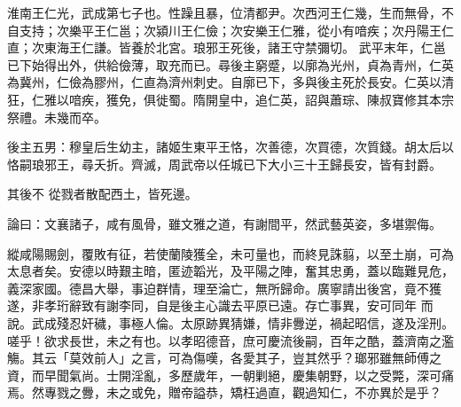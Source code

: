 \begin{pinyinscope}
 淮南王仁光，武成第七子也。性躁且暴，位清都尹。次西河王仁幾，生而無骨，不自支持；次樂平王仁邕；次潁川王仁儉；次安樂王仁雅，從小有喑疾；次丹陽王仁直；次東海王仁謙。皆養於北宮。琅邪王死後，諸王守禁彌切。
 武平末年，仁邕已下始得出外，供給儉薄，取充而已。尋後主窮蹙，以廓為光州，貞為青州，仁英為冀州，仁儉為膠州，仁直為濟州刺史。自廓已下，多與後主死於長安。仁英以清狂，仁雅以喑疾，獲免，俱徙蜀。隋開皇中，追仁英，詔與蕭琮、陳叔寶修其本宗祭禮。未幾而卒。



 後主五男：穆皇后生幼主，諸姬生東平王恪，次善德，次買德，次質錢。胡太后以恪嗣琅邪王，尋夭折。齊滅，周武帝以任城已下大小三十王歸長安，皆有封爵。



 其後不
 從戮者散配西土，皆死邊。



 論曰：文襄諸子，咸有風骨，雖文雅之道，有謝間平，然武藝英姿，多堪禦侮。



 縱咸陽賜劍，覆敗有征，若使蘭陵獲全，未可量也，而終見誅翦，以至土崩，可為太息者矣。安德以時艱主暗，匿迹韜光，及平陽之陣，奮其忠勇，蓋以臨難見危，義深家國。德昌大舉，事迫群情，理至淪亡，無所歸命。廣寧請出後宮，竟不獲遂，非孝珩辭致有謝李同，自是後主心識去平原已遠。存亡事異，安可同年
 而說。武成殘忍奸穢，事極人倫。太原跡異猜嫌，情非釁逆，禍起昭信，遂及淫刑。嗟乎！欲求長世，未之有也。以孝昭德音，庶可慶流後嗣，百年之酷，蓋濟南之濫觴。其云「莫效前人」之言，可為傷嘆，各愛其子，豈其然乎？瑯邪雖無師傅之資，而早聞氣尚。士開淫亂，多歷歲年，一朝剿絕，慶集朝野，以之受斃，深可痛焉。然專戮之釁，未之或免，贈帝謚恭，矯枉過直，觀過知仁，不亦異於是乎？



\end{pinyinscope}